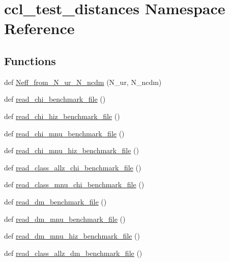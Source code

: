 \hypertarget{namespaceccl__test__distances}{}\section{ccl\+\_\+test\+\_\+distances Namespace Reference}
\label{namespaceccl__test__distances}
\subsection*{Functions}
\begin{DoxyCompactItemize}
\item 
def \mbox{\hyperlink{namespaceccl__test__distances_a0da11106f7f601d1ac8c71852fb35270}{Neff\+\_\+from\+\_\+\+N\+\_\+ur\+\_\+\+N\+\_\+ncdm}} (N\+\_\+ur, N\+\_\+ncdm)
\item 
def \mbox{\hyperlink{namespaceccl__test__distances_a7dd4773871d3361cfe222308017fa3fb}{read\+\_\+chi\+\_\+benchmark\+\_\+file}} ()
\item 
def \mbox{\hyperlink{namespaceccl__test__distances_a68c051384c4fe478913e6a671afa3ae8}{read\+\_\+chi\+\_\+hiz\+\_\+benchmark\+\_\+file}} ()
\item 
def \mbox{\hyperlink{namespaceccl__test__distances_a10a894ae3ff91a26c5a912c7cfaf1881}{read\+\_\+chi\+\_\+mnu\+\_\+benchmark\+\_\+file}} ()
\item 
def \mbox{\hyperlink{namespaceccl__test__distances_a8beea150fa105c5af9c4da704ab7981f}{read\+\_\+chi\+\_\+mnu\+\_\+hiz\+\_\+benchmark\+\_\+file}} ()
\item 
def \mbox{\hyperlink{namespaceccl__test__distances_a566ae859d5f0e8fb3179c594234d7100}{read\+\_\+class\+\_\+allz\+\_\+chi\+\_\+benchmark\+\_\+file}} ()
\item 
def \mbox{\hyperlink{namespaceccl__test__distances_a715a30aba8dcfe6b8712ce86c815171e}{read\+\_\+class\+\_\+mnu\+\_\+chi\+\_\+benchmark\+\_\+file}} ()
\item 
def \mbox{\hyperlink{namespaceccl__test__distances_a1eaf3545803a7803358f2ded10557990}{read\+\_\+dm\+\_\+benchmark\+\_\+file}} ()
\item 
def \mbox{\hyperlink{namespaceccl__test__distances_a4180f0f2e97de211286008b2a0a050dd}{read\+\_\+dm\+\_\+mnu\+\_\+benchmark\+\_\+file}} ()
\item 
def \mbox{\hyperlink{namespaceccl__test__distances_aa10a822700be058619a7391bdbc433d5}{read\+\_\+dm\+\_\+mnu\+\_\+hiz\+\_\+benchmark\+\_\+file}} ()
\item 
def \mbox{\hyperlink{namespaceccl__test__distances_a15d6c0001cdf1c1387ba93eaa5303ffe}{read\+\_\+class\+\_\+allz\+\_\+dm\+\_\+benchmark\+\_\+file}} ()

\end{DoxyCompactItemize}
